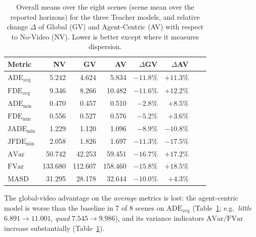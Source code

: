 \documentclass[11pt,a4paper]{article}
\begin{document}
\begin{table}[htpb]
    \centering
    \caption{Overall means over the eight scenes (scene mean over the reported
    horizons) for the three Teacher models, and relative change $\Delta$ of
    Global (GV) and Agent-Centric (AV) with respect to No-Video (NV). Lower is
    better except where it measures dispersion. \label{tab:overall}}
    \setlength{\tabcolsep}{6pt}
    \begin{tabular}{l rrr rr rr}
        \toprule
        Metric & NV & GV & AV & $\Delta$GV & $\Delta$AV \\
        \midrule
        $\mathrm{ADE_{avg}}$ & 5.242 & 4.624 & 5.834 & $-11.8\%$ & $+11.3\%$ \\
        $\mathrm{FDE_{avg}}$ & 9.346 & 8.266 & 10.482 & $-11.6\%$ & $+12.2\%$ \\
        $\mathrm{ADE_{min}}$ & 0.470 & 0.457 & 0.510 & $-2.8\%$  & $+8.5\%$ \\
        $\mathrm{FDE_{min}}$ & 0.556 & 0.527 & 0.576 & $-5.2\%$  & $+3.6\%$ \\
        $\mathrm{JADE_{min}}$ & 1.229 & 1.120 & 1.096 & $-8.9\%$  & $-10.8\%$ \\
        $\mathrm{JFDE_{min}}$ & 2.058 & 1.826 & 1.697 & $-11.3\%$ & $-17.5\%$ \\
        $\mathrm{AVar}$  & 50.742 & 42.253 & 59.451 & $-16.7\%$ & $+17.2\%$ \\
        $\mathrm{FVar}$  & 133.680 & 112.607 & 158.460 & $-15.8\%$ & $+18.5\%$ \\
        $\mathrm{MASD}$  & 31.295 & 28.178 & 32.644 & $-10.0\%$ & $+4.3\%$ \\
        \bottomrule
    \end{tabular}
\end{table}

The global-video advantage on the \emph{average} metrics is lost: the
agent-centric model is worse than the baseline in 7 of 8 scenes on
$\mathrm{ADE_{avg}}$ (Table~\ref{tab:overall}; e.g.\ \emph{little} $6.891 \to
11.001$, \emph{quad} $7.545 \to 9.986$), and its variance indicators
$\mathrm{AVar}/\mathrm{FVar}$ increase substantially (Table~\ref{tab:overall}).
\end{document}
